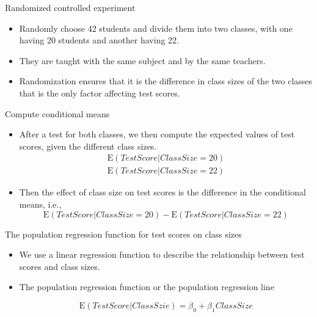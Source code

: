 \documentclass[presentation]{beamer}
\begin{document}
\begin{frame}[label={sec:orgacb6531}]{Randomized controlled experiment}
\begin{itemize}
\item Randomly choose 42 students and divide them into two classes,
with one having 20 students and another having 22.
\item They are
taught with the same subject and by the same teachers.
\item Randomization ensures that it is the difference in class sizes of
the two classes that is the only factor affecting test scores.
\end{itemize}
\end{frame}

\begin{frame}[label={sec:org2636fbc}]{Compute conditional means}
\begin{itemize}
\item After a test for both classes, we then compute the expected values
of test scores, given the different class sizes.
\begin{gather*}
\mathrm{E}(TestScore | ClassSize = 20) \\
\mathrm{E}(TestScore | ClassSize = 22)
\end{gather*}

\item Then the effect of class size on test scores is the difference in
the conditional means, i.e.,
\begin{equation*}
\mathrm{E}(TestScore | ClassSize = 20) - \mathrm{E}(TestScore | ClassSize = 22)
\end{equation*}
\end{itemize}
\end{frame}

\begin{frame}[label={sec:org6973932}]{The population regression function for test scores on class sizes}
\begin{itemize}
\item We use a linear regression function to describe the relationship
between test scores and class sizes.

\item The \alert{population regression function} or the \alert{population regression
line}

\begin{equation}
\label{eq:popreg-testscore}
\mathrm{E}(TestScore | ClassSzie) = \beta_0 + \beta_1 ClassSize
\end{equation}
\end{itemize}
\end{frame}
\end{document}
